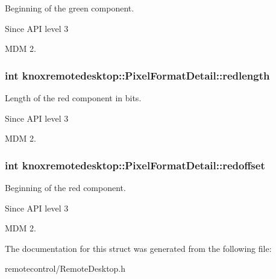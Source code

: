 \-Beginning of the green component. 

\begin{DoxySince}{\-Since}
\-A\-P\-I level 3 

\-M\-D\-M 2. 
\end{DoxySince}
\hypertarget{structknoxremotedesktop_1_1PixelFormatDetail_a370e9d8250b35b1f717a71a3737c73d5}{
\subsubsection[{redlength}]{\setlength{\rightskip}{0pt plus 5cm}int {\bf knoxremotedesktop\-::\-Pixel\-Format\-Detail\-::redlength}}}\label{structknoxremotedesktop_1_1PixelFormatDetail_a370e9d8250b35b1f717a71a3737c73d5}


\-Length of the red component in bits. 

\begin{DoxySince}{\-Since}
\-A\-P\-I level 3 

\-M\-D\-M 2. 
\end{DoxySince}
\hypertarget{structknoxremotedesktop_1_1PixelFormatDetail_a5c1e26d5565b29732f007ab2f4c89357}{
\subsubsection[{redoffset}]{\setlength{\rightskip}{0pt plus 5cm}int {\bf knoxremotedesktop\-::\-Pixel\-Format\-Detail\-::redoffset}}}\label{structknoxremotedesktop_1_1PixelFormatDetail_a5c1e26d5565b29732f007ab2f4c89357}


\-Beginning of the red component. 

\begin{DoxySince}{\-Since}
\-A\-P\-I level 3 

\-M\-D\-M 2. 
\end{DoxySince}


\-The documentation for this struct was generated from the following file\-:\begin{DoxyCompactItemize}
\item 
remotecontrol/\-Remote\-Desktop.\-h\end{DoxyCompactItemize}
